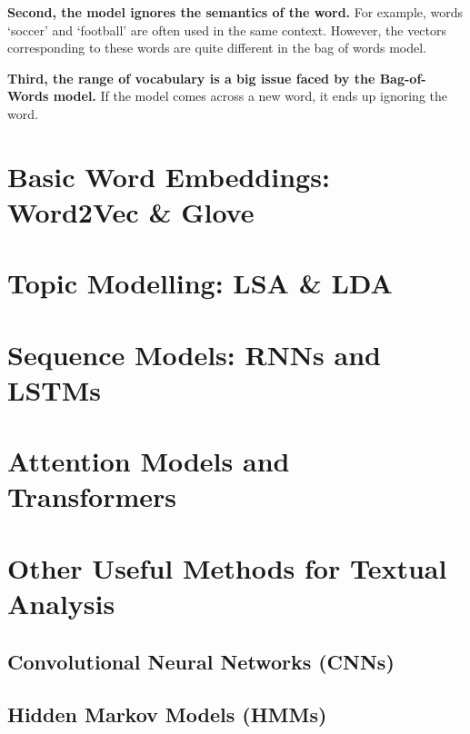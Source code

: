 \documentclass[
]{book}
\begin{document}
\textbf{Second, the model ignores the semantics of the word.} For example, words `soccer' and `football' are often used in the same context. However, the vectors corresponding to these words are quite different in the bag of words model.

\textbf{Third, the range of vocabulary is a big issue faced by the Bag-of-Words model.} If the model comes across a new word, it ends up ignoring the word.

\hypertarget{basic-word-embeddings-word2vec-glove}{%
\chapter{Basic Word Embeddings: Word2Vec \& Glove}\label{basic-word-embeddings-word2vec-glove}}

\hypertarget{topic-modelling-lsa-lda}{%
\chapter{Topic Modelling: LSA \& LDA}\label{topic-modelling-lsa-lda}}

\hypertarget{sequence-models-rnns-and-lstms}{%
\chapter{Sequence Models: RNNs and LSTMs}\label{sequence-models-rnns-and-lstms}}

\hypertarget{attention-models-and-transformers}{%
\chapter{Attention Models and Transformers}\label{attention-models-and-transformers}}

\hypertarget{other-useful-methods-for-textual-analysis}{%
\chapter{Other Useful Methods for Textual Analysis}\label{other-useful-methods-for-textual-analysis}}

\hypertarget{convolutional-neural-networks-cnns}{%
\section{Convolutional Neural Networks (CNNs)}\label{convolutional-neural-networks-cnns}}

\hypertarget{hidden-markov-models-hmms}{%
\section{Hidden Markov Models (HMMs)}\label{hidden-markov-models-hmms}}
\end{document}
